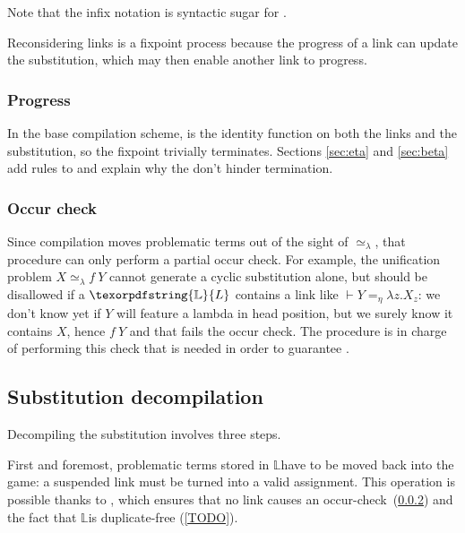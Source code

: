 \documentclass[sigconf,natbib=false,review]{acmart}
\newcommand{\UnifRel}{\ensuremath{\simeq}}
\newcommand{\Ue}{\ensuremath{\UnifRel_\lambda}\xspace}
\newcommand{\linketaM}[3]{\ensuremath{#1 \vdash #2 =_\eta #3}}
\newcommand{\linkStore}{\texorpdfstring{\ensuremath{\mathbb{L}}\xspace}{L}}
\begin{document}


\noindent
Note that the infix notation \elpiIn{((A ~\Ue~B) C D)} is syntactic sugar for
\elpiIn{((~\Ue\!\!\!~) A B C D)}.

Reconsidering links is a fixpoint process because the progress of a link
can update the substitution, which may then enable another link to progress.



\subsubsection{Progress}
In the base compilation scheme,  is the identity function
on both the links and the substitution, so the fixpoint trivially terminates.
Sections \ref{sec:eta} and \ref{sec:beta} add rules to 
and explain why the don't hinder termination.

\subsubsection{Occur check}\label{sec:oc}
Since compilation moves problematic terms out of the sight of \Ue{},
that procedure can only perform a partial occur check. For example, the
unification problem $X \Ue f~Y$ cannot generate a cyclic substitution alone,
but should be disallowed if a $\linkStore$ contains a link like
$\linketaM{}{Y}{\lambda z.X_z}$: we don't know yet if $Y$ will feature
a lambda in head position, but we surely know it contains $X$, hence
$f~Y$ and that fails the occur check.
The procedure  is in charge of
performing this check that is needed in order to
guarantee .

\subsection{Substitution decompilation}\label{sec:decompilation}

Decompiling the substitution involves three steps.

First and foremost, problematic terms stored in
\linkStore have to be moved back into the game:
a suspended link must be turned into a valid assignment.
This operation is possible thanks to ,
which ensures that no link causes an occur-check~(\ref{sec:oc})
and the fact that \linkStore is duplicate-free (\cref{TODO}).
\end{document}
